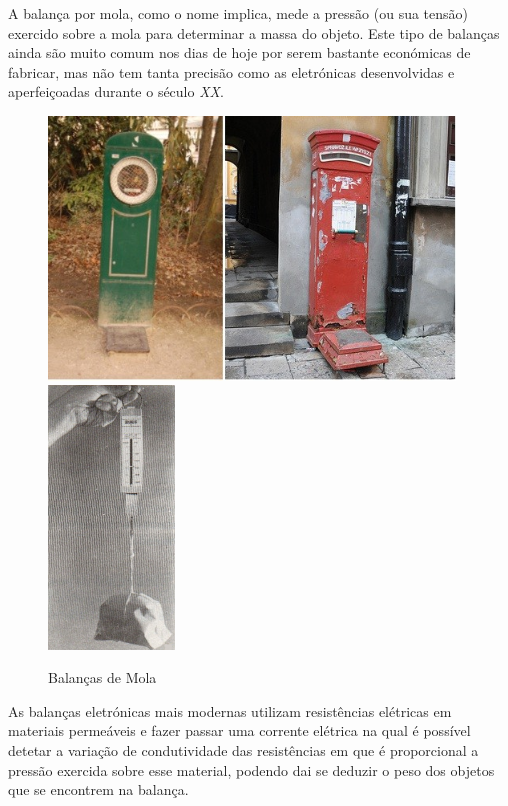 A balança por mola, como o nome implica, mede a pressão (ou sua tensão) exercido sobre a mola para determinar a massa do objeto. Este tipo de balanças ainda são muito comum nos dias de hoje por serem bastante económicas de fabricar, mas não tem tanta precisão como as eletrónicas desenvolvidas e aperfeiçoadas durante o século \textit{XX}.
\newline
\newline
\begin{minipage}[!b]{\linewidth}
	\begin{figure}[H]
		\captionsetup{justification=raggedright,singlelinecheck=false}
		\flushleft
		\includegraphics[height=7cm]{./image/PESTA/general/Public_Body_Scales_1.jpg}
		\hspace{.8cm}
		\includegraphics[height=7cm]{./image/PESTA/general/Balanca_Mola_1.jpg}
		\caption{Balanças de Mola}
		\label{Balanca_Mola_1}
	\end{figure}
\end{minipage}
\newpage
As balanças eletrónicas mais modernas utilizam resistências elétricas em materiais permeáveis e fazer passar uma corrente elétrica na qual é possível detetar a variação de condutividade das resistências em que é proporcional a pressão exercida sobre esse material, podendo dai se deduzir o peso dos objetos que se encontrem na balança.
